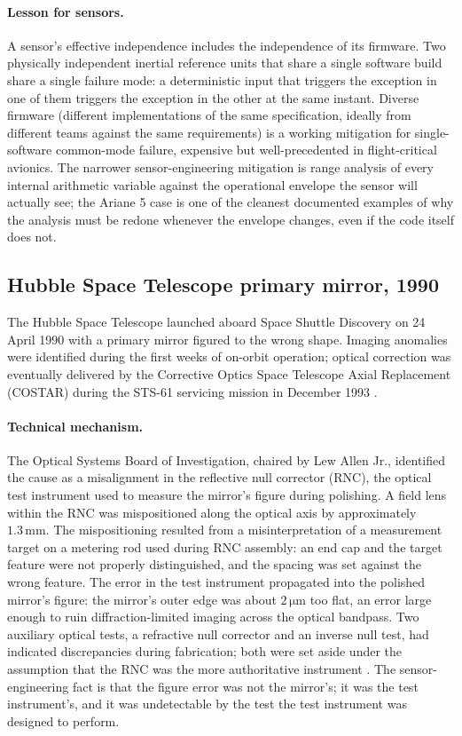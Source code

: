 \paragraph{Lesson for sensors.} A sensor's effective independence
includes the independence of its firmware. Two physically
independent inertial reference units that share a single software
build share a single failure mode: a deterministic input that
triggers the exception in one of them triggers the exception in the
other at the same instant. Diverse firmware (different
implementations of the same specification, ideally from different
teams against the same requirements) is a working mitigation for
single-software common-mode failure, expensive but well-precedented
in flight-critical avionics. The narrower sensor-engineering
mitigation is range analysis of every internal arithmetic variable
against the operational envelope the sensor will actually see; the
Ariane 5 case is one of the cleanest documented examples of why the
analysis must be redone whenever the envelope changes, even if the
code itself does not.

\subsection{Hubble Space Telescope primary mirror, 1990}

The Hubble Space Telescope launched aboard Space Shuttle Discovery
on 24 April 1990 with a primary mirror figured to the wrong shape.
Imaging anomalies were identified during the first weeks of on-orbit
operation; optical correction was eventually delivered by the
Corrective Optics Space Telescope Axial Replacement (COSTAR) during
the STS-61 servicing mission in December 1993
\cite{acc:nasa-hubble-optical-systems-1990}.

\paragraph{Technical mechanism.} The Optical Systems Board of
Investigation, chaired by Lew Allen Jr., identified the cause as a
misalignment in the reflective null corrector (RNC), the optical
test instrument used to measure the mirror's figure during
polishing. A field lens within the RNC was mispositioned along the
optical axis by approximately $1.3 \,\si{\milli\meter}$. The
mispositioning resulted from a misinterpretation of a measurement
target on a metering rod used during RNC assembly: an end cap and
the target feature were not properly distinguished, and the spacing
was set against the wrong feature. The error in the test instrument
propagated into the polished mirror's figure: the mirror's outer
edge was about $2 \,\si{\micro\meter}$ too flat, an error large
enough to ruin diffraction-limited imaging across the optical
bandpass. Two auxiliary optical tests, a refractive null corrector
and an inverse null test, had indicated discrepancies during
fabrication; both were set aside under the assumption that the RNC
was the more authoritative instrument
\cite{acc:nasa-hubble-optical-systems-1990}. The sensor-engineering
fact is that the figure error was not the mirror's; it was the test
instrument's, and it was undetectable by the test the test
instrument was designed to perform.

